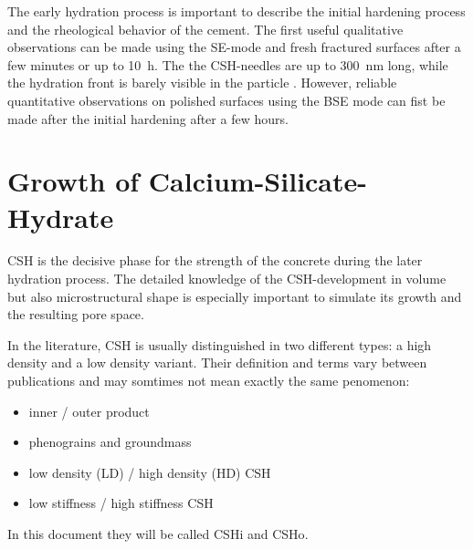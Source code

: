 The early hydration process is important to describe the initial hardening process and the rheological behavior of the cement.
The first useful qualitative observations can be made using the \ac{SE}-mode and fresh fractured surfaces \cite{stark.2001,voland.2000,suss.2001} after a few minutes or up to \SI{10}{\hour}.
The the \ac{CSH}-needles are up to \SI{300}{\nano\meter} long, while the hydration front is barely visible in the particle \cite{voland.2000}.
However, reliable quantitative observations on polished surfaces using the \ac{BSE} mode can fist be made after the initial hardening after a few hours.

\section{Growth of Calcium-Silicate-Hydrate}

\ac{CSH} is the decisive phase for the strength of the concrete during the later hydration process.
The detailed knowledge of the \ac{CSH}-development in volume but also microstructural shape is especially important to simulate its growth \cite{breugel.1997,nguyen-tuan.2023,nguyen-tuan.2024} and the resulting pore space.

In the literature, \ac{CSH} is usually distinguished in two different types: a high density and a low density variant.
Their definition and terms vary between publications and may somtimes not mean exactly the same penomenon:

\begin{itemize}
    \item inner / outer product \cite{scrivener.1986, richardson.1993} %
    \item phenograins and groundmass \cite{diamond.1993} %
    \item low density (LD) / high density (HD) \ac{CSH} \cite{jennings.2000} %
    \item low stiffness / high stiffness \ac{CSH} \cite{constantinides.2004} %
\end{itemize}
In this document they will be called \ac{CSHi} and \ac{CSHo}.


